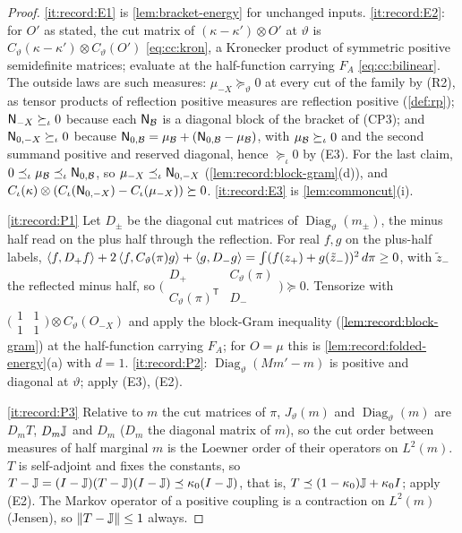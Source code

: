 \begin{proof}
\ref{it:record:E1} is \cref{lem:bracket-energy} for unchanged inputs.
\ref{it:record:E2}: for $O'$ as stated, the cut matrix of
$(\kappa-\kappa')\otimes O'$ at $\vartheta$ is
$C_\vartheta(\kappa-\kappa')\otimes C_\vartheta(O')$ \eqref{eq:cc:kron}, a
Kronecker product of symmetric positive semidefinite matrices; evaluate at the
half-function carrying $F_A$ \eqref{eq:cc:bilinear}. The outside laws are such
measures: $\mu_{-X}\succeq_\vartheta0$ at every cut of the family by (R2), as
tensor products of reflection positive measures are reflection positive
(\cref{def:rp}); $\mathsf N_{-X}\succeq_\iota0$ because each $\mathsf N_\mathcal B$ is a
diagonal block of the bracket of (CP3); and $\mathsf N_{0,-X}\succeq_\iota0$
because $\mathsf N_{0,\mathcal B}=\mu_\mathcal B+(\mathsf N_{0,\mathcal B}-\mu_\mathcal B)$, with
$\mu_\mathcal B\succeq_\iota0$ and the second summand positive and reserved
diagonal, hence $\succeq_\iota0$ by (E3). For the last claim, $0\preceq_\iota\mu_\mathcal B\preceq_\iota
\mathsf N_{0,\mathcal B}$, so $\mu_{-X}\preceq_\iota\mathsf N_{0,-X}$ (\cref{lem:record:block-gram}(d)),
and $C_\iota(\kappa)\otimes(C_\iota(\mathsf N_{0,-X})-C_\iota(\mu_{-X}))\succeq0$.
\ref{it:record:E3} is \cref{lem:commoncut}(i).

\ref{it:record:P1} Let $D_\pm$ be the diagonal cut matrices of
$\operatorname{Diag}_\vartheta(m_\pm)$, the minus half read on the plus half
through the reflection. For real $f,g$ on the plus-half labels,
$\left\langle f,D_+f\right\rangle+2\left\langle f,C_\vartheta(\pi)g\right\rangle+\left\langle g,D_-g\right\rangle=\int(f(z_+)+g(\tilde z_-))^2
\,d\pi\ge0$, with $\tilde z_-$ the reflected minus half, so
$\bigl(\begin{smallmatrix}D_+&C_\vartheta(\pi)\\
C_\vartheta(\pi)^{\mathsf T}&D_-\end{smallmatrix}\bigr)\succeq0$. Tensorize with
$\bigl(\begin{smallmatrix}1&1\\1&1\end{smallmatrix}\bigr)\otimes
C_\vartheta(O_{-X})$ and apply the block-Gram inequality
(\cref{lem:record:block-gram}) at the half-function carrying $F_A$; for
$O=\mu$ this is \cref{lem:record:folded-energy}(a) with $d=1$.
\ref{it:record:P2}: $\operatorname{Diag}_\vartheta(Mm'-m)$ is positive and
diagonal at $\vartheta$; apply (E3), (E2).

\ref{it:record:P3} Relative to $m$ the cut matrices of $\pi$,
$J_\vartheta(m)$ and $\operatorname{Diag}_\vartheta(m)$ are $D_mT$, $D_m\mathbb J$
and $D_m$ ($D_m$ the diagonal matrix of $m$), so the cut order between
measures of half marginal $m$ is the Loewner order of their operators on
$L^2(m)$. $T$ is self-adjoint and fixes the constants, so
$T-\mathbb J=(I-\mathbb J)(T-\mathbb J)(I-\mathbb J)\preceq\kappa_0(I-\mathbb J)$, that is,
$T\preceq(1-\kappa_0)\mathbb J+\kappa_0I$; apply (E2). The Markov operator of a
positive coupling is a contraction on $L^2(m)$ (Jensen), so
$\|T-\mathbb J\|\le1$ always.


\end{proof}
